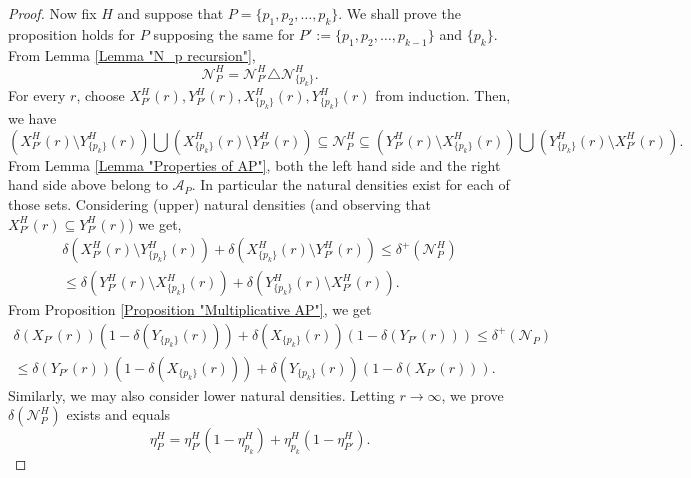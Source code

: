 \documentclass[12pt, a4paper]{amsart}
\theoremstyle{remark}
\theoremstyle{proof}
\numberwithin{equation}{section}
\numberwithin{assumption}{section}
\begin{document}
\begin{proof}
		Now fix $H$ and suppose that $P = \{p_1,p_2,\ldots, p_k\}$. We shall prove the proposition holds for $P$ supposing the same for $P':=\{p_1,p_2,\ldots, p_{k-1}\}$ and $\{p_k\}$. From Lemma \ref{Lemma "N_p recursion"}, 
		\[
		\mathcal{N}_P^H = \mathcal{N}_{P'}^H\triangle \mathcal{N}_{\{p_k\}}^H.
		\]
		For every $r$, choose $X_{P'}^H(r), Y_{P'}^H(r), X_{\{p_k\}}^H(r), Y_{\{p_k\}}^H(r)$ from induction. Then, we have
		\[
		\left(X_{P'}^H(r)\setminus Y_{\{p_k\}}^H(r)\right) \bigcup \left(X_{\{p_k\}}^H(r) \setminus Y_{P'}^H(r)\right) \subseteq \mathcal{N}_P^H \subseteq \left(Y_{P'}^H(r)\setminus X_{\{p_k\}}^H(r)\right) \bigcup \left(Y_{\{p_k\}}^H(r) \setminus X_{P'}^H(r)\right).
		\]
		From Lemma \ref{Lemma "Properties of AP"}, both the left hand side and the right hand side above belong to $\mathcal{A}_P$. In particular the natural densities exist for each of those sets. Considering (upper) natural densities (and observing that $X_{P'}^H(r)\subseteq Y_{P'}^H(r)$) we get,
		\begin{multline*}
			\delta\left(X_{P'}^H(r)\setminus Y_{\{p_k\}}^H(r)\right) +  \delta\left(X_{\{p_k\}}^H(r) \setminus Y_{P'}^H(r)\right)  \leqslant \delta^+(\mathcal{N}_P^H )\\
			\leqslant \delta\left(Y_{P'}^H(r)\setminus X_{\{p_k\}}^H(r)\right) + \delta \left(Y_{\{p_k\}}^H(r) \setminus X_{P'}^H(r)\right).
		\end{multline*}
		From Proposition \ref{Proposition "Multiplicative AP"}, we get
		\begin{multline*}
			\delta(X_{P'}(r))(1-\delta(Y_{\{p_k\}}(r))) + \delta(X_{\{p_k\}}(r))(1-\delta(Y_{P'}(r))) \leqslant \delta^+(\mathcal{N}_P) \\
			\leqslant \delta(Y_{P'}(r))(1-\delta(X_{\{p_k\}}(r))) + \delta(Y_{\{p_k\}}(r))(1-\delta(X_{P'}(r))).
		\end{multline*}
		Similarly, we may also consider lower natural densities. Letting $r\to\infty$, we prove $\delta(\mathcal{N}_P^H)$ exists and equals
		\begin{equation}\label{Equation "eta_P recursion"}
			\eta_{P}^H = \eta_{P'}^H(1-\eta_{p_k}^H) + \eta_{p_k}^H(1-\eta_{P'}^H).
		\end{equation}
	\end{proof}
	
\end{document}
